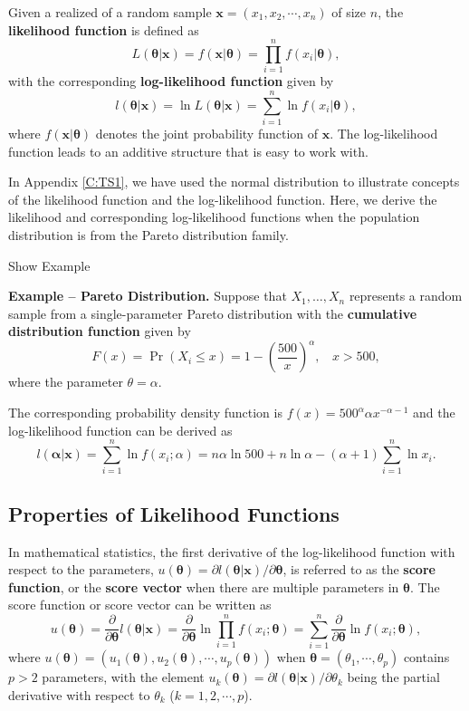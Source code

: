 \documentclass[]{book}
\theoremstyle{definition}
\theoremstyle{definition}
\theoremstyle{definition}
\theoremstyle{remark}
\begin{document}
Given a realized of a random sample \(\mathbf{x}=(x_1,x_2,\cdots,x_n)\)
of size \(n\), the \textbf{likelihood function} is defined as
\[L(\boldsymbol{\theta}|\mathbf{x})=f(\mathbf{x}|\boldsymbol{\theta})=\prod_{i=1}^nf(x_i|\boldsymbol{\theta}),\]
with the corresponding \textbf{log-likelihood function} given by
\[l(\boldsymbol{\theta}|\mathbf{x})=\ln L(\boldsymbol{\theta}|\mathbf{x})=\sum_{i=1}^n\ln f(x_i|\boldsymbol{\theta}),\]
where \(f(\mathbf{x}|\boldsymbol{\theta})\) denotes the joint
probability function of \(\mathbf{x}\). The log-likelihood function
leads to an additive structure that is easy to work with.

In Appendix \ref{C:TS1}, we have used the normal distribution to
illustrate concepts of the likelihood function and the log-likelihood
function. Here, we derive the likelihood and corresponding
log-likelihood functions when the population distribution is from the
Pareto distribution family.

Show Example

\hypertarget{EXM:S2b:LLK}{}
\textbf{Example -- Pareto Distribution.} Suppose that
\(X_1, \ldots, X_n\) represents a random sample from a single-parameter
Pareto distribution with the \textbf{cumulative distribution function}
given by
\[F(x) = \Pr(X_i\leq x)=1- \left(\frac{500}{x}\right)^{\alpha}, ~~~~ x>500,\]
where the parameter \(\theta = \alpha\).

The corresponding probability density function is
\(f(x) = 500^{\alpha} \alpha x^{-\alpha-1}\) and the log-likelihood
function can be derived as
\[l(\boldsymbol \alpha|\mathbf{x}) = \sum_{i=1}^n \ln f(x_i;\alpha) = n \alpha \ln 500 +n \ln \alpha -(\alpha+1)  \sum_{i=1}^n \ln x_i .\]

\subsection{Properties of Likelihood
Functions}\label{properties-of-likelihood-functions}

In mathematical statistics, the first derivative of the log-likelihood
function with respect to the parameters,
\(u(\boldsymbol\theta)=\partial l(\boldsymbol \theta|\mathbf{x})/\partial \boldsymbol \theta\),
is referred to as the \textbf{score function}, or the \textbf{score
vector} when there are multiple parameters in \(\boldsymbol\theta\). The
score function or score vector can be written as
\[u(\boldsymbol\theta)=\frac{ \partial}{\partial \boldsymbol \theta} l(\boldsymbol \theta|\mathbf{x})
    =\frac{ \partial}{\partial \boldsymbol \theta} \ln \prod_{i=1}^n
    f(x_i;\boldsymbol \theta ) =\sum_{i=1}^n \frac{
    \partial}{\partial \boldsymbol \theta}
    \ln f(x_i;\boldsymbol \theta ),\] where
\(u(\boldsymbol\theta)=(u_1(\boldsymbol\theta),u_2(\boldsymbol\theta),\cdots,u_p(\boldsymbol\theta))\)
when \(\boldsymbol\theta=(\theta_1,\cdots,\theta_p)\) contains \(p>2\)
parameters, with the element
\(u_k(\boldsymbol\theta)=\partial l(\boldsymbol \theta|\mathbf{x})/\partial \theta_k\)
being the partial derivative with respect to \(\theta_k\)
(\(k=1,2,\cdots,p\)).
\end{document}
